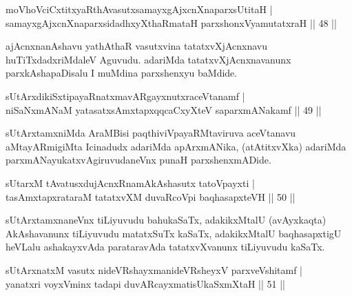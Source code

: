 \begin{shl}
moVhoVciCxtitxyaRthAvasutxsamayxgAjxcnXnaparxsUtitaH |\\
samayxgAjxcnXnaparxsidadhxyXthaRmataH parxshonxV\s yamutatxraH \hfill || 48 ||
\end{shl}

\begin{artha}
ajAcnxnanAshavu yathAthaR vasutxvina tatatxvXjAcnxnavu huTiTxdadxriMdaleV Aguvudu. adariMda tatatxvXjAcnxnavanunx parxkAshapaDisalu I muMdina parxshenxyu baMdide.
\end{artha}

\begin{shl}
sUtArxdikiSxtipayaRnatxmavARgayxnutxraceVtanamf |\\
\footnotemark[1]niSaNxmANaM yatasatxsAmxtapxqqcaCxyXteV \footnotemark[2]saparxmANakamf \hfill || 49 ||
\end{shl}

\begin{artha}
sUtArxtamxniMda AraMBisi paqthiviVpayaRMtaviruva aceVtanavu aMtayARmigiMta Icinadudx adariMda apArxmANika, (atAtitxvXka) adariMda parxmANayukatxvAgiruvudaneVnx punaH parxshenxmADide.
\end{artha}


\begin{shl}
sUtarxM tAvatusxdujAcnxRnamAkAshasutx tatoV\s payxti |\\
tasAmxtapxrataraM tatatxvXM duvaRcoV\s pi baqhasapxteVH \hfill || 50 ||
\end{shl}

\begin{artha}
sUtArxtamxnaneVnx tiLiyuvudu bahukaSaTx, adakikxMtalU (avAyxkaqta) AkAshavanunx tiLiyuvudu matatxSuTx kaSaTx, adakikxMtalU baqhasapxtigU heVLalu ashakayxvAda parataravAda tatatxvXvanunx tiLiyuvudu kaSaTx.
\end{artha}


\begin{shl}
sUtArxnatxM vasutx nideVRshayxmanideVRsheyxV parxveVshitamf |\\
yanatxri voyxVminx tadapi duvARcayxmatisUkaSxmXtaH \hfill || 51 ||
\end{shl}

